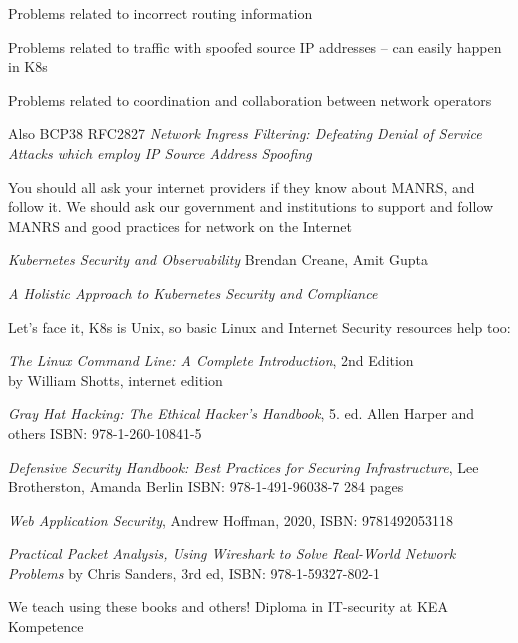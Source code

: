 \documentclass[Screen16to9,17pt]{foils}
\begin{document}
\begin{list2}
\item Problems related to incorrect routing information
\item Problems related to traffic with spoofed source IP addresses -- can easily happen in K8s
\item Problems related to coordination and collaboration between network operators
\item Also BCP38 RFC2827 \emph{Network Ingress Filtering: Defeating Denial of Service Attacks
which employ IP Source Address Spoofing}
\end{list2}

You should all ask your internet providers if they know about MANRS, and follow it. We should ask our government and institutions to support and follow MANRS and good practices for network on the Internet


\begin{list2}


\item \emph{Kubernetes Security and Observability} Brendan Creane, Amit Gupta %

\end{list2}



\begin{list2}
\item
\item \emph{A Holistic Approach to Kubernetes Security and Compliance}\\

\end{list2}


Let's face it, K8s is Unix, so basic Linux and Internet Security resources help too:
\begin{list2}
\item \emph{The Linux Command Line: A Complete Introduction}, 2nd Edition\\
 by William Shotts, internet edition 
\item \emph{Gray Hat Hacking: The Ethical Hacker's Handbook}, 5. ed. Allen Harper and others ISBN: 978-1-260-10841-5
\item \emph{Defensive Security Handbook: Best Practices for Securing Infrastructure}, Lee Brotherston, Amanda Berlin ISBN: 978-1-491-96038-7 284 pages
\item \emph{Web Application Security}, Andrew Hoffman, 2020, ISBN: 9781492053118
\item \emph{Practical Packet Analysis, Using Wireshark to Solve Real-World Network Problems}
by Chris Sanders, 3rd ed, ISBN: 978-1-59327-802-1
\end{list2}

We teach using these books and others! Diploma in IT-security at KEA Kompetence\\
\end{document}
